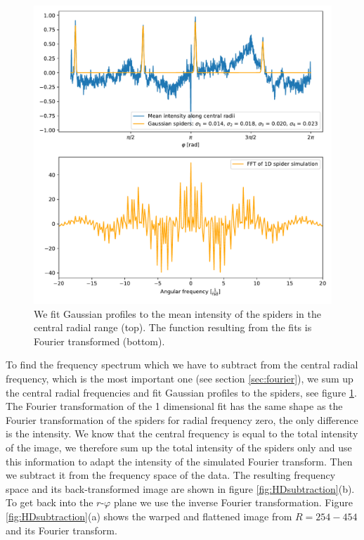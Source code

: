 \begin{figure}[H]
	\centering
		\includegraphics[width=1.0\textwidth]{pics/Spider_Gaussianfit_FFT.pdf}
		\caption{We fit Gaussian profiles to the mean intensity of the spiders in the central radial range (top). The function resulting from the fits is Fourier transformed (bottom).}
		\label{fig:Spider_Gaussianfit_FFT}
\end{figure}
To find the frequency spectrum which we have to subtract from the central radial frequency, which is the most important one (see section \ref{sec:fourier}), we sum up the central radial frequencies and fit Gaussian profiles to the spiders, see figure \ref{fig:Spider_Gaussianfit_FFT}. The Fourier transformation of the 1 dimensional fit has the same shape as the Fourier transformation of the spiders for radial frequency zero, the only difference is the intensity. We know that the central frequency is equal to the total intensity of the image, we therefore sum up the total intensity of the spiders only and use this information to adapt the intensity of the simulated Fourier transform. Then we subtract it from the frequency space of the data. The resulting frequency space and its back-transformed image are shown in figure \ref{fig:HDsubtraction}(b). To get back into the $r$-$\varphi$ plane we use the inverse Fourier transformation. Figure \ref{fig:HDsubtraction}(a) shows the warped and flattened image from $R=254-454$ and its Fourier transform. \\
